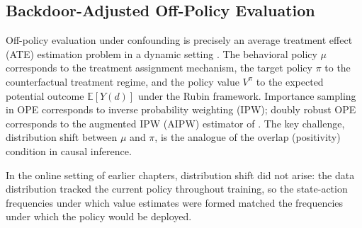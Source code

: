 \subsection{Backdoor-Adjusted Off-Policy Evaluation}
\label{subsec:backdoor_ope}

Off-policy evaluation under confounding is precisely an average treatment effect (ATE) estimation problem in a dynamic setting \citep{bannon2020causality}. The behavioral policy $\mu$ corresponds to the treatment assignment mechanism, the target policy $\pi$ to the counterfactual treatment regime, and the policy value $V^\pi$ to the expected potential outcome $\mathbb{E}[Y(d)]$ under the Rubin framework. Importance sampling in OPE corresponds to inverse probability weighting (IPW); doubly robust OPE corresponds to the augmented IPW (AIPW) estimator of \citet{robins1994estimation}. The key challenge, distribution shift between $\mu$ and $\pi$, is the analogue of the overlap (positivity) condition in causal inference.

In the online setting of earlier chapters, distribution shift did not arise: the data distribution tracked the current policy throughout training, so the state-action frequencies under which value estimates were formed matched the frequencies under which the policy would be deployed.

